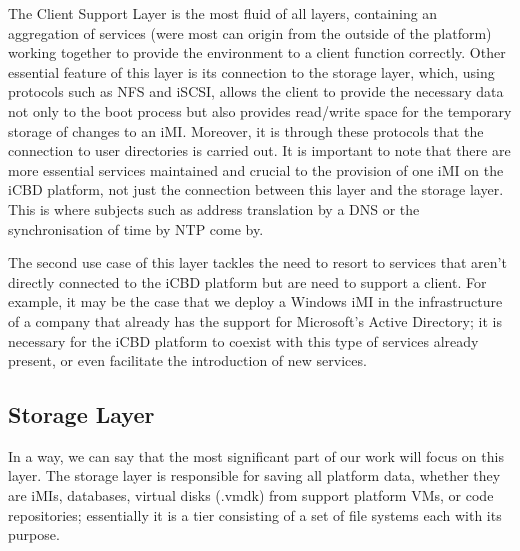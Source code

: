 The Client Support Layer is the most fluid of all layers, containing an aggregation of services (were most can origin from the outside of the platform) working together to provide the environment to a client function correctly.
Other essential feature of this layer is its connection to the storage layer, which, using protocols such as NFS and iSCSI, allows the client to provide the necessary data not only to the boot process but also provides read/write space for the temporary storage of changes to an iMI. Moreover, it is through these protocols that the connection to user directories is carried out.
It is important to note that there are more essential services maintained and crucial to the provision of one iMI on the iCBD platform, not just the connection between this layer and the storage layer. This is where subjects such as address translation by a DNS or the synchronisation of time by NTP come by.

The second use case of this layer tackles the need to resort to services that aren't directly connected to the iCBD platform but are need to support a client. For example, it may be the case that we deploy a Windows iMI in the infrastructure of a company that already has the support for Microsoft's Active Directory; it is necessary for the iCBD platform to coexist with this type of services already present, or even facilitate the introduction of new services.




\subsection{Storage Layer}
\label{sub:icbd_storage_layer}

In a way, we can say that the most significant part of our work will focus on this layer. The storage layer is responsible for saving all platform data, whether they are iMIs, databases, virtual disks (.vmdk) from support platform VMs, or code repositories; essentially it is a tier consisting of a set of file systems each with its purpose. 

